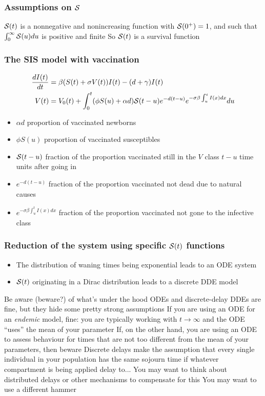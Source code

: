 \documentclass[aspectratio=169]{beamer}
\begin{document}
\begin{frame}\frametitle{Assumptions on $\S$}
$\S(t)$ is a nonnegative and nonincreasing function with $\S(0^+)=1$, and such that $\int_0^\infty \S(u)du$ is positive and finite
\vfill
So $\S(t)$ is a survival function
\end{frame}

\begin{frame}\frametitle{The SIS model with vaccination} 
\begin{subequations}\label{sys:SIVS_general}
\begin{align}
  \frac{dI(t)}{dt}&= \beta(S(t)+\sigma V(t))I(t)-(d+\gamma)I(t)
  \label{sys:SIVS_general_I}\\ 
  V(t)&= V_0(t)  
  +\int_0^t(\phi S(u)+\alpha d)\S(t-u)e^{-d(t-u)}
  e^{-\sigma\beta\int_u^tI(x)dx}du \label{sys:SIVS_general_V}
\end{align}
\end{subequations}
\vfill
\begin{itemize}
\item $\alpha d$ proportion of vaccinated newborns
\item $\phi S(u)$ proportion of vaccinated susceptibles
\item $\S(t-u)$ fraction of the proportion vaccinated still in the $V$
  class $t-u$ time units after going in
\item $e^{-d(t-u)}$ fraction of the proportion vaccinated
not dead due to natural causes
\item $e^{-\sigma\beta\int_u^t I(x)dx}$ fraction of the proportion
  vaccinated not gone to the infective class
\end{itemize} 
\end{frame}

\begin{frame}\frametitle{Reduction of the system using specific $\S(t)$ functions}
\vfill
\begin{itemize}
\item The distribution of waning times being exponential leads to
 an ODE system
\vfill
\item $\S(t)$ originating in a Dirac distribution leads to a discrete DDE model
\end{itemize}
\end{frame}


\begin{frame}{Be aware (beware?) of what's under the hood}
ODEs and discrete-delay DDEs are fine, but they hide some pretty strong assumptions
\vfill
If you are using an ODE for an \emph{endemic} model, fine: you are typically working with $t\to\infty$ and the ODE ``uses'' the mean of your parameter
\vfill
If, on the other hand, you are using an ODE to assess behaviour for times that are not too different from the mean of your parameters, then beware
\vfill
Discrete delays make the assumption that every single individual in your population has the same sojourn time if whatever compartment is being applied delay to... You may want to think about distributed delays or other mechanisms to compensate for this
\vfill
You may want to use a different hammer 
\end{frame}
\end{document}
